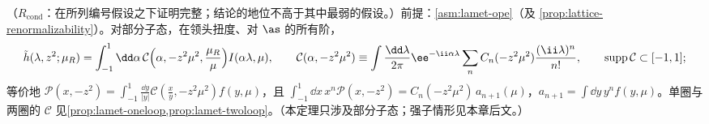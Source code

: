 \begin{theorem}\label{thm:lamet-coordinate}
（$R_{\mathrm{cond}}$：在所列编号假设之下证明完整；结论的地位不高于其中最弱的假设。）前提：\cref{asm:lamet-ope}（及 \cref{prop:lattice-renormalizability}）。对部分子态，在领头扭度、对 $\as$ 的所有阶，
\begin{equation}\label{eq:lamet-coord-fact}
\tilde h(\lambda,z^2;\mu_R)=\int_{-1}^1\dd\alpha\,\mathcal C\Big(\alpha,-z^2\mu^2,\frac{\mu_R}\mu\Big)I(\alpha\lambda,\mu),\qquad
\mathcal C(\alpha,-z^2\mu^2)\equiv\int\frac{\dd\lambda}{2\pi}\ee^{-\ii\alpha\lambda}\sum_nC_n(-z^2\mu^2)\frac{(\ii\lambda)^n}{n!},\qquad{\rm supp}\,\mathcal C\subset[-1,1];
\end{equation}%
等价地 $\mathcal P(x,-z^2)=\int_{-1}^1\frac{\dd y}{|y|}\mathcal C(\frac xy,-z^2\mu^2)f(y,\mu)$，且 $\int_{-1}^1\dd x\,x^n\mathcal P(x,-z^2)=C_n(-z^2\mu^2)\,a_{n+1}(\mu)$，$a_{n+1}=\int\dd y\,y^nf(y,\mu)$。单圈与两圈的 $\mathcal C$ 见\cref{prop:lamet-oneloop,prop:lamet-twoloop}。（本定理只涉及部分子态；强子情形见本章后文。）
\end{theorem}

